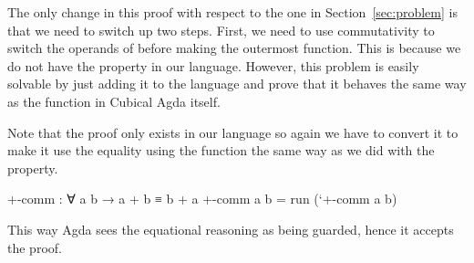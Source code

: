 The only change in this proof with respect to the one in Section~\ref{sec:problem} is that
we need to switch up two steps. First, we need to use commutativity to switch the
operands of \AgdaFunction{\_+\_} before making  the outermost function.
This is because we do not have the  property in our language.
However, this problem is easily solvable by just adding it to the language and
prove that it behaves the same way as the  function in Cubical Agda itself.

Note that the proof only exists in our language so again we have to convert
it to make it use the equality using the  function the same
way as we did with the  property.

\begin{code}
+-comm : ∀ a b → a + b ≡ b + a
+-comm a b = run (`+-comm a b)
\end{code}

This way Agda sees the equational reasoning as being guarded, hence it accepts the proof.
